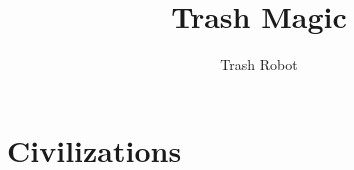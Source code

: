 \documentclass[ebook,12pt,openany,onesided]{memoir} %
\title{Trash Magic}
\author{Trash Robot}
\begin{document}
\frontmatter

\clearpage

\clearpage

\newpage
\thispagestyle{empty}
\mbox{}

\maketitle



%

\mainmatter

\chapter{Civilizations}




\end{document}
